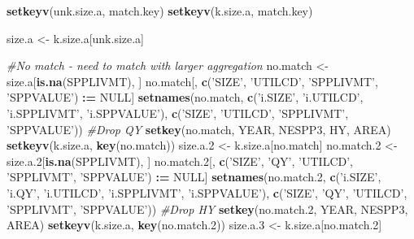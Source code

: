 \documentclass[]{article}
\newenvironment{Shaded}{\begin{snugshade}}{\end{snugshade}}
\newcommand{\KeywordTok}[1]{\textcolor[rgb]{0.13,0.29,0.53}{\textbf{#1}}}
\newcommand{\DecValTok}[1]{\textcolor[rgb]{0.00,0.00,0.81}{#1}}
\newcommand{\StringTok}[1]{\textcolor[rgb]{0.31,0.60,0.02}{#1}}
\newcommand{\CommentTok}[1]{\textcolor[rgb]{0.56,0.35,0.01}{\textit{#1}}}
\newcommand{\OtherTok}[1]{\textcolor[rgb]{0.56,0.35,0.01}{#1}}
\newcommand{\OperatorTok}[1]{\textcolor[rgb]{0.81,0.36,0.00}{\textbf{#1}}}
\newcommand{\ErrorTok}[1]{\textcolor[rgb]{0.64,0.00,0.00}{\textbf{#1}}}
\newcommand{\NormalTok}[1]{#1}
\begin{document}
\begin{Shaded}
\begin{Highlighting}[]
  \KeywordTok{setkeyv}\NormalTok{(unk.size.a, match.key)}
  \KeywordTok{setkeyv}\NormalTok{(k.size.a,   match.key)}
  
\NormalTok{  size.a <-}\StringTok{ }\NormalTok{k.size.a[unk.size.a]}
  
  \CommentTok{#No match - need to match with larger aggregation}
\NormalTok{  no.match  <-}\StringTok{ }\NormalTok{size.a[}\KeywordTok{is.na}\NormalTok{(SPPLIVMT), ]}
\NormalTok{  no.match[, }\KeywordTok{c}\NormalTok{(}\StringTok{'SIZE'}\NormalTok{, }\StringTok{'UTILCD'}\NormalTok{, }\StringTok{'SPPLIVMT'}\NormalTok{, }\StringTok{'SPPVALUE'}\NormalTok{) }\OperatorTok{:}\ErrorTok{=}\StringTok{ }\OtherTok{NULL}\NormalTok{]}
  \KeywordTok{setnames}\NormalTok{(no.match, }\KeywordTok{c}\NormalTok{(}\StringTok{'i.SIZE'}\NormalTok{, }\StringTok{'i.UTILCD'}\NormalTok{, }\StringTok{'i.SPPLIVMT'}\NormalTok{, }\StringTok{'i.SPPVALUE'}\NormalTok{), }
           \KeywordTok{c}\NormalTok{(}\StringTok{'SIZE'}\NormalTok{, }\StringTok{'UTILCD'}\NormalTok{, }\StringTok{'SPPLIVMT'}\NormalTok{, }\StringTok{'SPPVALUE'}\NormalTok{))}
  \CommentTok{#Drop QY}
  \KeywordTok{setkey}\NormalTok{(no.match, YEAR, NESPP3, HY, AREA)}
  \KeywordTok{setkeyv}\NormalTok{(k.size.a, }\KeywordTok{key}\NormalTok{(no.match))}
\NormalTok{  size.a.}\DecValTok{2}\NormalTok{ <-}\StringTok{ }\NormalTok{k.size.a[no.match]}
\NormalTok{  no.match.}\DecValTok{2}\NormalTok{ <-}\StringTok{ }\NormalTok{size.a.}\DecValTok{2}\NormalTok{[}\KeywordTok{is.na}\NormalTok{(SPPLIVMT), ]}
\NormalTok{  no.match.}\DecValTok{2}\NormalTok{[, }\KeywordTok{c}\NormalTok{(}\StringTok{'SIZE'}\NormalTok{, }\StringTok{'QY'}\NormalTok{, }\StringTok{'UTILCD'}\NormalTok{, }\StringTok{'SPPLIVMT'}\NormalTok{, }\StringTok{'SPPVALUE'}\NormalTok{) }\OperatorTok{:}\ErrorTok{=}\StringTok{ }\OtherTok{NULL}\NormalTok{]}
  \KeywordTok{setnames}\NormalTok{(no.match.}\DecValTok{2}\NormalTok{, }\KeywordTok{c}\NormalTok{(}\StringTok{'i.SIZE'}\NormalTok{, }\StringTok{'i.QY'}\NormalTok{, }\StringTok{'i.UTILCD'}\NormalTok{, }\StringTok{'i.SPPLIVMT'}\NormalTok{, }\StringTok{'i.SPPVALUE'}\NormalTok{), }
           \KeywordTok{c}\NormalTok{(}\StringTok{'SIZE'}\NormalTok{, }\StringTok{'QY'}\NormalTok{, }\StringTok{'UTILCD'}\NormalTok{, }\StringTok{'SPPLIVMT'}\NormalTok{, }\StringTok{'SPPVALUE'}\NormalTok{))}
  \CommentTok{#Drop HY}
  \KeywordTok{setkey}\NormalTok{(no.match.}\DecValTok{2}\NormalTok{, YEAR, NESPP3, AREA)}
  \KeywordTok{setkeyv}\NormalTok{(k.size.a, }\KeywordTok{key}\NormalTok{(no.match.}\DecValTok{2}\NormalTok{))}
\NormalTok{  size.a.}\DecValTok{3}\NormalTok{ <-}\StringTok{ }\NormalTok{k.size.a[no.match.}\DecValTok{2}\NormalTok{]}

\end{Highlighting}
\end{Shaded}
\end{document}
